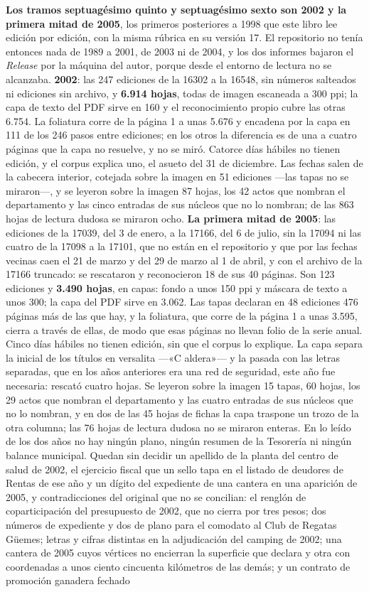 \textbf{Los tramos septuagésimo quinto y septuagésimo sexto son 2002 y la primera mitad de 2005}, los primeros posteriores a 1998 que este libro lee edición por edición, con la misma rúbrica en su versión 17. El repositorio no tenía entonces nada de 1989 a 2001, de 2003 ni de 2004, y los dos informes bajaron el \textit{Release} por la máquina del autor, porque desde el entorno de lectura no se alcanzaba. \textbf{2002}: las 247 ediciones de la 16302 a la 16548, sin números salteados ni ediciones sin archivo, y \textbf{6.914 hojas}, todas de imagen escaneada a 300 ppi; la capa de texto del PDF sirve en 160 y el reconocimiento propio cubre las otras 6.754. La foliatura corre de la página 1 a unas 5.676 y encadena por la capa en 111 de los 246 pasos entre ediciones; en los otros la diferencia es de una a cuatro páginas que la capa no resuelve, y no se miró. Catorce días hábiles no tienen edición, y el corpus explica uno, el asueto del 31 de diciembre. Las fechas salen de la cabecera interior, cotejada sobre la imagen en 51 ediciones ---las tapas no se miraron---, y se leyeron sobre la imagen 87 hojas, los 42 actos que nombran el departamento y las cinco entradas de sus núcleos que no lo nombran; de las 863 hojas de lectura dudosa se miraron ocho. \textbf{La primera mitad de 2005}: las ediciones de la 17039, del 3 de enero, a la 17166, del 6 de julio, sin la 17094 ni las cuatro de la 17098 a la 17101, que no están en el repositorio y que por las fechas vecinas caen el 21 de marzo y del 29 de marzo al 1 de abril, y con el archivo de la 17166 truncado: se rescataron y reconocieron 18 de sus 40 páginas. Son 123 ediciones y \textbf{3.490 hojas}, en capas: fondo a unos 150 ppi y máscara de texto a unos 300; la capa del PDF sirve en 3.062. Las tapas declaran en 48 ediciones 476 páginas más de las que hay, y la foliatura, que corre de la página 1 a unas 3.595, cierra a través de ellas, de modo que esas páginas no llevan folio de la serie anual. Cinco días hábiles no tienen edición, sin que el corpus lo explique. La capa separa la inicial de los títulos en versalita ---«C aldera»--- y la pasada con las letras separadas, que en los años anteriores era una red de seguridad, este año fue necesaria: rescató cuatro hojas. Se leyeron sobre la imagen 15 tapas, 60 hojas, los 29 actos que nombran el departamento y las cuatro entradas de sus núcleos que no lo nombran, y en dos de las 45 hojas de fichas la capa traspone un trozo de la otra columna; las 76 hojas de lectura dudosa no se miraron enteras. En lo leído de los dos años no hay ningún plano, ningún resumen de la Tesorería ni ningún balance municipal. Quedan sin decidir un apellido de la planta del centro de salud de 2002, el ejercicio fiscal que un sello tapa en el listado de deudores de Rentas de ese año y un dígito del expediente de una cantera en una aparición de 2005, y contradicciones del original que no se concilian: el renglón de coparticipación del presupuesto de 2002, que no cierra por tres pesos; dos números de expediente y dos de plano para el comodato al Club de Regatas Güemes; letras y cifras distintas en la adjudicación del camping de 2002; una cantera de 2005 cuyos vértices no encierran la superficie que declara y otra con coordenadas a unos ciento cincuenta kilómetros de las demás; y un contrato de promoción ganadera fechado 